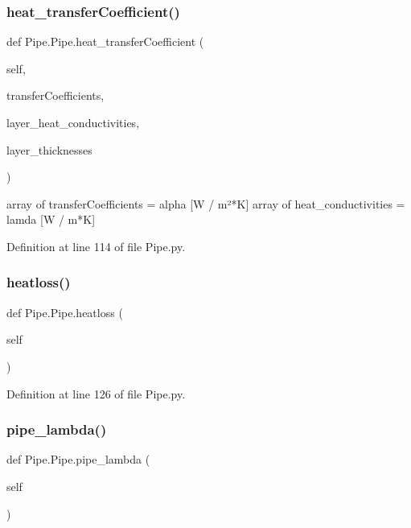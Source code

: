 \subsubsection{\texorpdfstring{heat\+\_\+transfer\+Coefficient()}{heat\_transferCoefficient()}}
{\footnotesize\ttfamily def Pipe.\+Pipe.\+heat\+\_\+transfer\+Coefficient (\begin{DoxyParamCaption}\item[{}]{self,  }\item[{}]{transfer\+Coefficients,  }\item[{}]{layer\+\_\+heat\+\_\+conductivities,  }\item[{}]{layer\+\_\+thicknesses }\end{DoxyParamCaption})}

\begin{DoxyVerb}array of transferCoefficients = alpha [W / m²*K]
array of heat_conductivities = lamda [W / m*K]
\end{DoxyVerb}
 

Definition at line 114 of file Pipe.\+py.

\mbox{\label{class_pipe_1_1_pipe_a51bf5b3d3334c008e8cb92c8e8e2e9d1}} 
\subsubsection{\texorpdfstring{heatloss()}{heatloss()}}
{\footnotesize\ttfamily def Pipe.\+Pipe.\+heatloss (\begin{DoxyParamCaption}\item[{}]{self }\end{DoxyParamCaption})}



Definition at line 126 of file Pipe.\+py.

\mbox{\label{class_pipe_1_1_pipe_aa09f88a2a098f433547773dcee75da6c}} 
\subsubsection{\texorpdfstring{pipe\+\_\+lambda()}{pipe\_lambda()}}
{\footnotesize\ttfamily def Pipe.\+Pipe.\+pipe\+\_\+lambda (\begin{DoxyParamCaption}\item[{}]{self }\end{DoxyParamCaption})}

